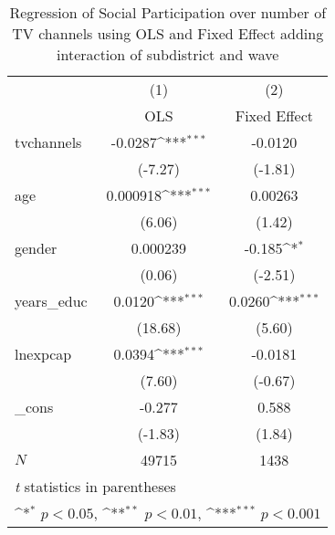 \begin{table}[htbp]\centering
\def\sym#1{\ifmmode^{#1}\else\(^{#1}\)\fi}
\caption{ Regression of Social Participation over number of TV channels using OLS and Fixed Effect adding interaction of subdistrict and wave}
\begin{tabular}{l*{2}{c}}
\hline\hline
            &\multicolumn{1}{c}{(1)}&\multicolumn{1}{c}{(2)}\\
            &\multicolumn{1}{c}{OLS}&\multicolumn{1}{c}{Fixed Effect}\\
\hline
tvchannels  &     -0.0287\sym{***}&     -0.0120         \\
            &     (-7.27)         &     (-1.81)         \\
[1em]
age         &    0.000918\sym{***}&     0.00263         \\
            &      (6.06)         &      (1.42)         \\
[1em]
gender      &    0.000239         &      -0.185\sym{*}  \\
            &      (0.06)         &     (-2.51)         \\
[1em]
years\_educ  &      0.0120\sym{***}&      0.0260\sym{***}\\
            &     (18.68)         &      (5.60)         \\
[1em]
lnexpcap    &      0.0394\sym{***}&     -0.0181         \\
            &      (7.60)         &     (-0.67)         \\
[1em]
\_cons      &      -0.277         &       0.588         \\
            &     (-1.83)         &      (1.84)         \\
\hline
\(N\)       &       49715         &        1438         \\
\hline\hline
\multicolumn{3}{l}{\footnotesize \textit{t} statistics in parentheses}\\
\multicolumn{3}{l}{\footnotesize \sym{*} \(p<0.05\), \sym{**} \(p<0.01\), \sym{***} \(p<0.001\)}\\
\end{tabular}
\end{table}
